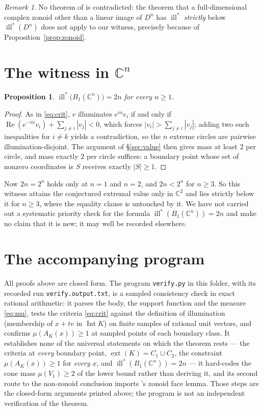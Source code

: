 \documentclass[11pt]{amsart}
\newtheorem{proposition}[theorem]{Proposition}
\theoremstyle{remark}
\newtheorem{remark}[theorem]{Remark}
\DeclareMathOperator{\ill}{ill}
\DeclareMathOperator{\ext}{ext}
\DeclareMathOperator{\Int}{Int}
\newcommand{\CC}{\mathbb{C}}
\newcommand{\illstar}{\ill^{*}}
\begin{document}
\begin{remark}\label{rem:consequences}
No theorem of \cite{RSS} is contradicted: the theorem that a
full-dimensional complex zonoid other than a linear image of $D^{n}$ has
$\illstar$ \emph{strictly} below $\illstar(D^{n})$ does not apply to our
witness, precisely because of Proposition~\ref{prop:zonoid}.
\end{remark}

\section{The witness in \texorpdfstring{$\CC^{n}$}{Cn}}\label{sec:dim}

\begin{proposition}\label{prop:dim}
$\illstar\bigl(B_{1}(\CC^{n})\bigr)=2n$ for every $n\ge1$.
\end{proposition}

\begin{proof}
As in \eqref{eq:crit}, $v$ illuminates $e^{i\alpha}e_{i}$ if and only if
$\operatorname{Re}(e^{-i\alpha}v_{i})+\sum_{j\ne i}|v_{j}|<0$, which forces
$|v_{i}|>\sum_{j\ne i}|v_{j}|$; adding two such inequalities for $i\ne k$ yields
a contradiction, so the $n$ extreme circles are pairwise illumination-disjoint.
The argument of \S\ref{sec:value} then gives mass at least $2$ per circle, and
mass exactly $2$ per circle suffices: a boundary point whose set of nonzero
coordinates is $S$ receives exactly $|S|\ge1$.
\end{proof}

Now $2n=2^{n}$ holds only at $n=1$ and $n=2$, and $2n<2^{n}$ for $n\ge3$. So
this witness attains the conjectured extremal value only in $\CC^{2}$ and lies
strictly below it for $n\ge3$, where the equality clause is untouched by it. We
have not carried out a systematic priority check for the formula
$\illstar(B_{1}(\CC^{n}))=2n$ and make no claim that it is new; it may well be
recorded elsewhere.

\section{The accompanying program}\label{sec:program}

All proofs above are closed form. The program \texttt{verify.py} in this folder,
with its recorded run \texttt{verify.output.txt}, is a sampled consistency check
in exact rational arithmetic: it parses the body, the support function and the
measure \eqref{eq:mu}, tests the criteria \eqref{eq:crit} against the definition
of illumination (membership of $x+tv$ in $\Int K$) on finite samples of rational
unit vectors, and confirms $\mu(A_{K}(x))\ge1$ at sampled points of each boundary
class. It establishes none of the universal statements on which the theorem rests
--- the criteria at \emph{every} boundary point, $\ext(K)=C_{1}\cup C_{2}$, the
constraint $\mu(A_{K}(x))\ge1$ for \emph{every} $x$, and
$\illstar(B_{1}(\CC^{n}))=2n$ --- it hard-codes the cone mass $\mu(V_{1})\ge2$ of the lower bound rather than deriving
it, and its second route to the non-zonoid conclusion imports \cite{RSS}'s
zonoid face lemma. Those steps are the closed-form arguments printed above; the
program is not an independent verification of the theorem.
\end{document}
